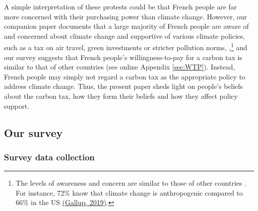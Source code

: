 \documentclass[12pt]{article} %
\begin{document}
A simple interpretation of these protests could be that French people are far more concerned with their purchasing power than climate change. However, our companion paper documents that a large majority of French people are aware of and concerned about climate change and supportive of various climate policies, such as a tax on air travel, green investments or stricter pollution norms, \citep{douenne_french_2019},\footnote{The levels of awareness and concern are similar to those of other countries \citep{stokes_global_2015}. For instance, 72\% know that climate change is anthropogenic compared to 66\% in the US \href{https://news.gallup.com/poll/1615/environment.aspx}{(Gallup, 2019)}.} and our survey suggests that French people’s willingness-to-pay for a carbon tax is similar to that of other countries (see online Appendix \ref{sec:WTP}). Instead, French people may simply not regard a carbon tax as the appropriate policy to address climate change. Thus, the present paper sheds light on people's beliefs about the carbon tax, how they form their beliefs and how they affect policy support. %

\subsection{Our survey\label{subsec:Survey-Beliefs-climate}}

\subsubsection{Survey data collection }

\end{document}
